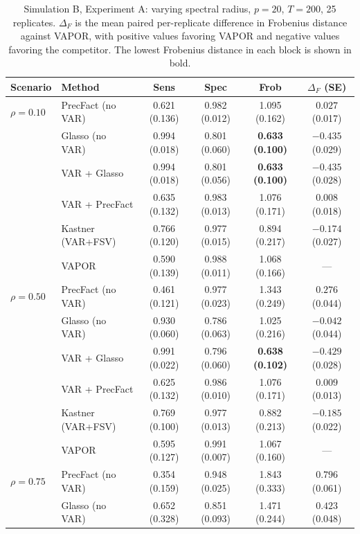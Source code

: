 \begin{table}[h!]
\centering
\small
\setlength{\tabcolsep}{4pt}
\caption{Simulation B, Experiment A: varying spectral radius, $p=20$, $T=200$, 25 replicates. $\Delta_F$ is the mean paired per-replicate difference in Frobenius distance against VAPOR, with positive values favoring VAPOR and negative values favoring the competitor. The lowest Frobenius distance in each block is shown in bold.}
\label{tab:sim-b-autocorr}
\begin{tabular}{llcccc}
\toprule
Scenario & Method & Sens & Spec & Frob & $\Delta_F$ (SE) \\
\midrule
$\rho = 0.10$ & PrecFact (no VAR)  & 0.621 (0.136) & 0.982 (0.012) & 1.095 (0.162) & $0.027$ (0.017) \\
              & Glasso (no VAR)    & 0.994 (0.018) & 0.801 (0.060) & \textbf{0.633 (0.100)} & $-0.435$ (0.029) \\
              & VAR + Glasso       & 0.994 (0.018) & 0.801 (0.056) & \textbf{0.633 (0.100)} & $-0.435$ (0.028) \\
              & VAR + PrecFact     & 0.635 (0.132) & 0.983 (0.013) & 1.076 (0.171) & $0.008$ (0.018) \\
              & Kastner (VAR+FSV)  & 0.766 (0.120) & 0.977 (0.015) & 0.894 (0.217) & $-0.174$ (0.027) \\
              & VAPOR              & 0.590 (0.139) & 0.988 (0.011) & 1.068 (0.166) & --- \\
\midrule
$\rho = 0.50$ & PrecFact (no VAR)  & 0.461 (0.121) & 0.977 (0.023) & 1.343 (0.249) & $0.276$ (0.044) \\
              & Glasso (no VAR)    & 0.930 (0.060) & 0.786 (0.063) & 1.025 (0.216) & $-0.042$ (0.044) \\
              & VAR + Glasso       & 0.991 (0.022) & 0.796 (0.060) & \textbf{0.638 (0.102)} & $-0.429$ (0.028) \\
              & VAR + PrecFact     & 0.625 (0.132) & 0.986 (0.010) & 1.076 (0.171) & $0.009$ (0.013) \\
              & Kastner (VAR+FSV)  & 0.769 (0.100) & 0.977 (0.013) & 0.882 (0.213) & $-0.185$ (0.022) \\
              & VAPOR              & 0.595 (0.127) & 0.991 (0.007) & 1.067 (0.160) & --- \\
\midrule
$\rho = 0.75$ & PrecFact (no VAR)  & 0.354 (0.159) & 0.948 (0.025) & 1.843 (0.333) & $0.796$ (0.061) \\
              & Glasso (no VAR)    & 0.652 (0.328) & 0.851 (0.093) & 1.471 (0.244) & $0.423$ (0.048) \\

\end{tabular}
\end{table}
